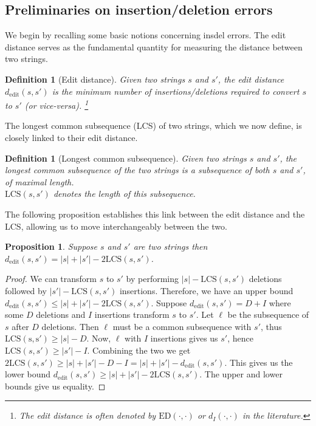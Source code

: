 \documentclass[draft, onecolumn, 11pt]{IEEEtran}
\newtheorem{definition}[theorem]{Definition}
\newtheorem{proposition}[theorem]{Proposition}
\begin{document}
\subsection{Preliminaries on insertion/deletion errors} 

We begin by recalling some basic notions concerning insdel errors. The edit distance serves as the fundamental quantity for measuring the distance between two strings. 

\begin{definition}[Edit distance]
	Given two strings $s$ and $s'$, the edit distance $d_{\mathrm{edit}}(s,s')$ is the minimum number of insertions/deletions required to convert $s$ to $s'$ (or vice-versa). \footnote{The edit distance is often denoted by $\mathrm{ED}(\cdot, \cdot)$ or $d_I(\cdot, \cdot)$ in the literature.}  
\end{definition}

The longest common subsequence (LCS) of two strings, which we now define, is closely linked to their edit distance.

\begin{definition}[Longest common subsequence]
	Given two strings $s$ and $s'$, the longest common subsequence of the two strings is a subsequence of both $s$ and $s'$, of maximal length.
	\\$\mathrm{LCS}(s,s')$ denotes the length of this subsequence.
\end{definition}

The following proposition establishes this link between the edit distance and the LCS, allowing us to move interchangeably between the two.

\begin{proposition}
	\label{ED-LCS}
	Suppose $s$ and $s'$ are two strings then $d_{\mathrm{edit}}(s,s') = |s| + |s'| - 2\mathrm{LCS}(s,s')$.	
\end{proposition}
\begin{proof} 
	We can transform $s$ to $s'$ by performing $|s| - \mathrm{LCS}(s,s')$ deletions followed by $|s'| - \mathrm{LCS}(s,s')$ insertions. Therefore, we have an upper bound $d_{\mathrm{edit}}(s,s') \leq |s| + |s'| - 2\mathrm{LCS}(s,s')$.
	Suppose $d_{\mathrm{edit}}(s,s') = D + I$ where some $D$ deletions and $I$ insertions transform $s$ to $s'$. Let $\ell$ be the subsequence of $s$ after $D$ deletions. Then $\ell$ must be a common subsequence with $s'$, thus $\mathrm{LCS(s,s')} \geq |s| - D$. 
	Now, $\ell$ with $I$ insertions gives us $s'$, hence $\mathrm{LCS}(s,s') \geq |s'| - I$. Combining the two we get $2\mathrm{LCS}(s,s') \geq |s| + |s'| - D - I = |s| + |s'| - d_{\mathrm{edit}}(s,s')$. This gives us the lower bound $d_{\mathrm{edit}}(s,s') \geq |s| + |s'| - 2\mathrm{LCS}(s,s')$. 
	The upper and lower bounds give us equality.
\end{proof}
\end{document}
